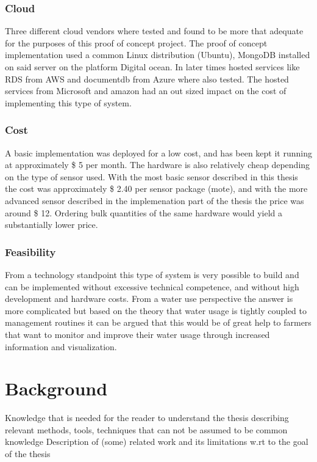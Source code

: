 \documentclass[]{uiophd}
\begin{document}
\subsection{Cloud}
Three different cloud vendors where tested and found to be more that adequate for the purposes of this proof of concept project. The proof of concept implementation used a common Linux distribution (Ubuntu), MongoDB installed on said server on the platform Digital ocean. In later times hosted services like RDS from AWS and documentdb from Azure where also tested. The hosted services from Microsoft and amazon had an out sized impact on the cost of implementing this type of system.

\subsection{Cost}
A basic implementation was deployed for a low cost, and has been kept it running at approximately \$ 5 per month. The hardware is also relatively cheap depending on the type of sensor used. With the most basic sensor described in this thesis the cost was approximately \$ 2.40 per sensor package (mote), and with the more advanced sensor described in the implemenation part of the thesis the price was around \$ 12. Ordering bulk quantities of the same hardware would yield a substantially lower price.

\subsection{Feasibility}
From a technology standpoint this type of system is very possible to build and can be implemented without excessive technical competence, and without high development and hardware costs. From a water use perspective the answer is more complicated but based on the theory that water usage is tightly coupled to management routines it can be argued that this would be of great help to farmers that want to monitor and improve their water usage through increased information and visualization.


\chapter{Background}

Knowledge that is needed for the reader to understand the thesis describing relevant methods, tools, techniques that can not be assumed to be common knowledge
Description of (some) related work and its limitations w.rt to the goal of the thesis
\end{document}
